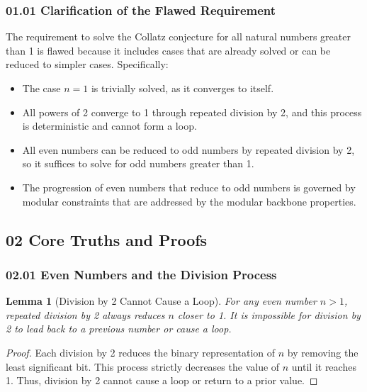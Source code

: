\documentclass[11pt]{article}
\newtheorem{lemma}[theorem]{Lemma}
\begin{document}
\subsubsection*{01.01 Clarification of the Flawed Requirement}

The requirement to solve the Collatz conjecture for all natural numbers greater than 1 is flawed because it includes cases that are already solved or can be reduced to simpler cases. Specifically:
\begin{itemize}
    \item The case \(n=1\) is trivially solved, as it converges to itself.
    \item All powers of 2 converge to 1 through repeated division by 2, and this process is deterministic and cannot form a loop.
    \item All even numbers can be reduced to odd numbers by repeated division by 2, so it suffices to solve for odd numbers greater than 1.
    \item The progression of even numbers that reduce to odd numbers is governed by modular constraints that are addressed by the modular backbone properties.
\end{itemize}

\subsection*{02 Core Truths and Proofs}

\subsubsection*{02.01 Even Numbers and the Division Process}

\begin{lemma}[Division by 2 Cannot Cause a Loop]
For any even number \( n > 1 \), repeated division by 2 always reduces \( n \) closer to 1. It is impossible for division by 2 to lead back to a previous number or cause a loop.
\end{lemma}

\begin{proof}
Each division by 2 reduces the binary representation of \( n \) by removing the least significant bit. This process strictly decreases the value of \( n \) until it reaches 1. Thus, division by 2 cannot cause a loop or return to a prior value.
\end{proof}
\end{document}
